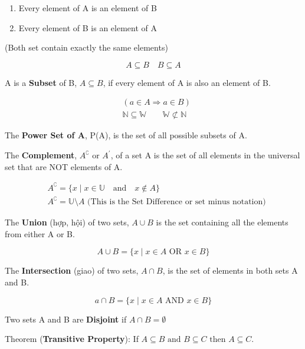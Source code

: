 \begin{enumerate}
  \item Every element of A is an element of B
  \item Every element of B is an element of A
\end{enumerate}

(Both set contain exactly the same elements)

\[A \subseteq B\quad B \subseteq A\]

\vspace{7 mm}

A is a \textbf{Subset} of B, $A \subseteq B$, if every element of A is also an element of B.

\[
  \begin{aligned}
    &(a\in A \Longrightarrow a\in B)\\
    &\mathbb{N} \subseteq \mathbb{W} \qquad \mathbb{W} \not\subset \mathbb{N}
  \end{aligned}
\]

The \textbf{Power Set of A}, P(A), is the set of all possible subsets of A.

\vspace{10 mm}

The \textbf{Complement}, \(A^\complement \text{ or } A^\prime\), of a set A is the set of all elements in the universal set that are NOT elements of A.

\[
  \begin{aligned}
    &A^\complement = \{x \mid x \in \mathbb{U} \quad \text{and} \quad x \not\in A \}\\
    &A^\complement = \mathbb{U} \setminus A \text{ (This is the Set Difference or set minus notation)}
  \end{aligned}
\]

\vspace{8 mm}

The \textbf{Union} (hợp, hội) of two sets, $A \cup B$ is the set containing all the elements from either A or B.

\[A \cup B = \{ x \mid x \in A \text{ OR } x \in B \}\]

The \textbf{Intersection} (giao) of two sets, $A \cap B$, is the set of elements in both sets A and B.

\[a \cap B = \{ x \mid x\in A \text{ AND } x\in B \}\]

Two sets A and B are \textbf{Disjoint} if $A \cap B = \emptyset$

Theorem (\textbf{Transitive Property}): If $A \subseteq B \text{ and } B \subseteq C \text{ then } A \subseteq C$.

